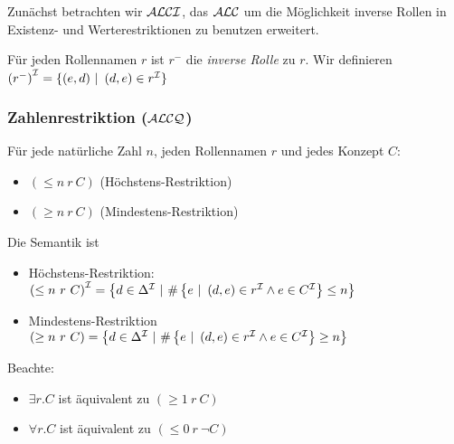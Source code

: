 Zunächst betrachten wir $\mathcal{A}\mathcal{L}\mathcal{C}\mathcal{I}$, das $\mathcal{A}\mathcal{L}\mathcal{C}$ um die Möglichkeit inverse Rollen in Existenz- und Werterestriktionen zu benutzen erweitert.

\begin{definition}
Für jeden Rollennamen $r$ ist $r^{-}$ die \emph{inverse
Rolle} zu $r$. Wir definieren \\
$\left( r^{-} \right)^{\mathcal{I}} = \left\{ \left( e,d \right)\  \right|\ \left( d,e \right) \in r^{\mathcal{I}}\}$
\end{definition}

\subsubsection{Zahlenrestriktion (\texorpdfstring{$\mathcal{A}\mathcal{L}\mathcal{C}\mathcal{Q}$}{ALCQ})}\label{zahlenrestriktion-alcq}

\begin{definition}[Zahlenrestriktion]
Für jede natürliche Zahl $n$, jeden Rollennamen $r$ und
jedes Konzept $C$:

\begin{itemize}
  \item $\left( \leq n\ r\ C \right)$ (Höchstens-Restriktion)
  \item $\left( \geq n\ r\ C \right)$ (Mindestens-Restriktion)
\end{itemize}

Die Semantik ist
\begin{itemize}
\item
  Höchstens-Restriktion:
  $\left( \leq n\ r\ C \right)^{\MI} = \left\{ d \in \Delta^{\MI}\ |\ \#\left\{ e\ |\ \left( d,e \right) \in r^{\MI} \land e \in C^{\MI} \right\} \leq n \right\}$
\item
  Mindestens-Restriktion
  $( \geq n\ r\ C) = \left\{ d \in \Delta^{\mathcal{I}}\ |\ \#\left\{ e\ |\ \left( d,e \right) \in r^{\mathcal{I}} \land e \in C^{\mathcal{I}} \right\} \geq n \right\}$
\end{itemize}
\end{definition}

Beachte:

\begin{itemize}
  \item $\exists r.C$ ist äquivalent zu $(\geq 1\ r\ C)$
  \item $\forall r.C$ ist äquivalent zu $(\leq 0\ r\ \neg C)$
\end{itemize}
